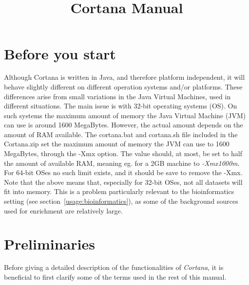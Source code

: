 \documentclass{article}
\begin{document}
\title{Cortana Manual}

\maketitle


\section{Before you start}
\label{section:before}
Although Cortana is written in Java, and therefore platform independent, it will behave slightly different on different operation systems and/or platforms.
These differences arise from small variations in the Java Virtual Machines, used in different situations.
The main issue is with 32-bit operating systems (OS).
On such systems the maximum amount of memory the Java Virtual Machine (JVM) can use is around 1600 MegaBytes.
However, the actual amount depends on the amount of RAM available.
The cortana.bat and cortana.sh file included in the Cortana.zip set the maximum amount of memory the JVM can use to 1600 MegaBytes, through the -Xmx option.
The value should, at most, be set to half the amount of available RAM, meaning eg. for a 2GB machine to \emph{-Xmx1000m}.
For 64-bit OSes no such limit exists, and it should be save to remove the -Xmx.
Note that the above means that, especially for 32-bit OSes, not all datasets will fit into memory.
This is a problem particularly relevant to the bioinformatics setting (see section~\ref{usage:bioinformatics}), as some of the background sources used for enrichment are relatively large.





\section{Preliminaries}
\label{section:preliminaries}
Before giving a detailed description of the functionalities of \emph{Cortana}, it is beneficial to first clarify some of the terms used in the rest of this manual.
\end{document}
